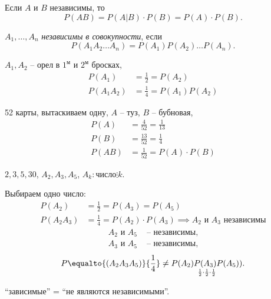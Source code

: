 \begin{remark}
  Если $A$ и $B$ независимы, то
  \[
    P(AB) = P(A|B)\cdot P(B) = P(A)\cdot P(B).
  \]
\end{remark}

\begin{definition}
  $A_1,\ldots,A_n$ \emph{независимы в совокупности}, если
  \[
    P(A_1A_2 \ldots A_n) = P(A_1)P(A_2)\ldots P(A_n).
  \]
\end{definition}

\begin{eg}
  $A_1,A_2$ -- орел в $1^{\text{м}}$ и $2^{\text{м}}$ бросках,
  \begin{align*}
    P(A_1) &= \frac{1}{2} = P(A_2) \\
    P(A_1A_2) &= \frac{1}{4} = P(A_1)P(A_2)
  \end{align*}
\end{eg}

\begin{eg}
  52 карты, вытаскиваем одну, $A$ -- туз, $B$ -- бубновая,
  \begin{align*}
    P(A) &= \frac{4}{52} = \frac{1}{13} \\
    P(B) &= \frac{13}{52} = \frac{1}{4} \\
    P(AB) &= \frac{1}{52} = P(A)\cdot P(B)
  \end{align*}
\end{eg}

\begin{eg}
  $2,3,5,30$, $A_2,A_3,A_5$, $A_k: \text{число} \vdots k$.

  Выбираем одно число:
  \begin{align*}
    P(A_2) &= \frac{1}{2} = P(A_3) = P(A_5) \\
    P(A_2A_3) &= \frac{1}{4} = P(A_2)\cdot P(A_3) \implies A_2 \text{ и } A_3 \text{ независимы}
  \end{align*}
  \begin{align*}
    A_2 \text{ и } A_5 & \text{ -- независимы}, \\
    A_3 \text{ и } A_5 & \text{ -- независимы},
  \end{align*}
  \[
    P\equalto{(A_2A_3A_5)}{\frac{1}{4}} \ne \underset{\frac{1}{2}\cdot \frac{1}{2} \cdot \frac{1}{2}}{P(A_2)P(A_3)P(A_5))}.
  \]
\end{eg}

\begin{remark}
  ``зависимые'' = ``не являются независимыми''.
\end{remark}

